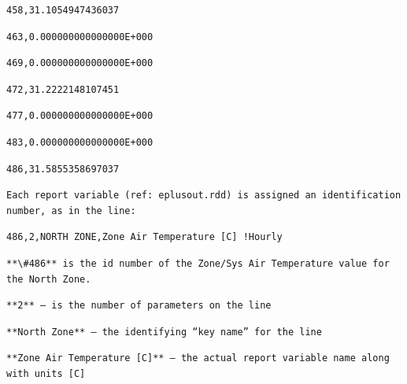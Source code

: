 \begin{lstlisting}
458,31.1054947436037
\end{lstlisting}

\begin{lstlisting}
463,0.000000000000000E+000
\end{lstlisting}

\begin{lstlisting}
469,0.000000000000000E+000
\end{lstlisting}

\begin{lstlisting}
472,31.2222148107451
\end{lstlisting}

\begin{lstlisting}
477,0.000000000000000E+000
\end{lstlisting}

\begin{lstlisting}
483,0.000000000000000E+000
\end{lstlisting}

\begin{lstlisting}
486,31.5855358697037
\end{lstlisting}

\begin{lstlisting}
Each report variable (ref: eplusout.rdd) is assigned an identification number, as in the line:
\end{lstlisting}

\begin{lstlisting}
486,2,NORTH ZONE,Zone Air Temperature [C] !Hourly
\end{lstlisting}

\begin{lstlisting}
**\#486** is the id number of the Zone/Sys Air Temperature value for the North Zone.
\end{lstlisting}

\begin{lstlisting}
**2** – is the number of parameters on the line
\end{lstlisting}

\begin{lstlisting}
**North Zone** – the identifying “key name” for the line
\end{lstlisting}

\begin{lstlisting}
**Zone Air Temperature [C]** – the actual report variable name along with units [C]
\end{lstlisting}

